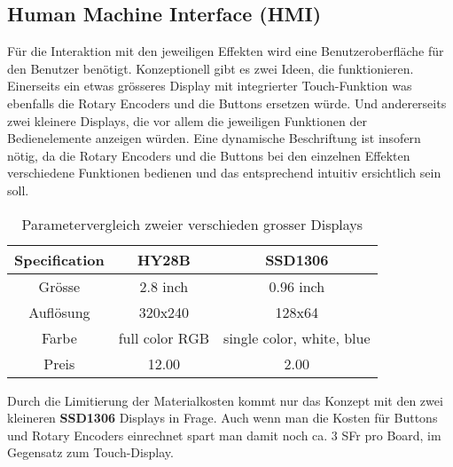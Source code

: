 \subsection{Human Machine Interface (HMI)}
\label{subsec:Konzept_HMI}

Für die Interaktion mit den jeweiligen Effekten wird eine Benutzeroberfläche für den Benutzer benötigt. Konzeptionell gibt es zwei Ideen, die funktionieren. Einerseits ein etwas grösseres Display mit integrierter Touch-Funktion was ebenfalls die Rotary Encoders und die Buttons ersetzen würde. Und andererseits zwei kleinere Displays, die vor allem die jeweiligen Funktionen der Bedienelemente anzeigen würden. Eine dynamische Beschriftung ist insofern nötig, da die Rotary Encoders und die Buttons bei den einzelnen Effekten verschiedene Funktionen bedienen und das entsprechend intuitiv ersichtlich sein soll.

\begin{table}[H]
	\centering
	\begin{tabular}{|c|c|c|}
		\hline
		\textbf{Specification} & \textbf{HY28B}             & \textbf{SSD1306} \\ \hline
		Grösse              & 2.8 inch                & 0.96 inch    \\ \hline
		Auflösung           & 320x240                         & 128x64      \\ \hline
		Farbe              & full color RGB & single color, white, blue    \\ \hline
		Preis         & 12.00                         & 2.00            \\ \hline
	\end{tabular}
	\caption{Parametervergleich zweier verschieden grosser Displays}
	\label{tab:displays}
\end{table}

Durch die Limitierung der Materialkosten kommt nur das Konzept mit den zwei kleineren \textbf{SSD1306} Displays in Frage. Auch wenn man die Kosten für Buttons und Rotary Encoders einrechnet spart man damit noch ca. 3 SFr pro Board, im Gegensatz zum Touch-Display.
